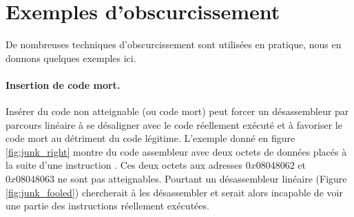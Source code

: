 



\section{Exemples d'obscurcissement  \label{sec:ex_obsc}}
De nombreuses techniques d'obscurcissement sont utilisées en pratique, nous en donnons quelques exemples ici.

\paragraph{Insertion de code mort.}
Insérer du code non atteignable (ou code mort) peut forcer un désassembleur par parcours linéaire à se désaligner avec le code réellement exécuté et à favoriser le code mort au détriment du code légitime.
L'exemple donné en figure \ref{fig:junk_right} montre du code assembleur avec deux octets de données placés à la suite d'une instruction \jmp. Ces deux octets aux adresses $0x08048062$ et $0x08048063$ ne sont pas atteignables. Pourtant un désassembleur linéaire (Figure \ref{fig:junk_fooled}) chercherait à les désassembler et serait alors incapable de voir une partie des instructions réellement exécutées.


